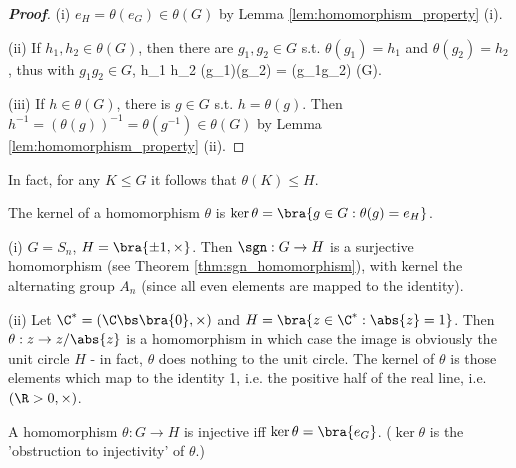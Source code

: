 \begin{proof}[\bf Proof]
\ben
\item [(i)] $e_H = \theta(e_G)\in \theta(G)$ by Lemma \ref{lem:homomorphism_property} (i).
\item [(ii)] If $h_1,h_2\in \theta(G)$, then there are $g_1,g_2\in G$ s.t. $\theta(g_1) = h_1$ and $\theta(g_2) = h_2$, thus with $g_1g_2\in G$,
\be
h_1 h_2 \in \theta(g_1)\theta(g_2) = \theta(g_1g_2) \in \theta(G).
\ee

\item [(iii)] If $h\in \theta(G)$, there is $g\in G$ s.t. $h = \theta(g)$. Then $h^{-1} = (\theta(g))^{-1} = \theta(g^{-1}) \in \theta(G)$ by Lemma \ref{lem:homomorphism_property} (ii).
\een
\end{proof}

\begin{remark}
In fact, for any $K\leq G$ it follows that $\theta(K) \leq H$.
\end{remark}


\begin{definition}[kernel]\label{def:kernel_group_homomorphism}
The kernel of a homomorphism $\theta$ is $\ker\theta = \bra{g\in G:\theta(g) =e_H}$.
\end{definition}

\begin{example}
\ben
\item [(i)] $G=S_n$, $H=\bra{\pm 1,\times}$. Then $\sgn: G\to H$ is a surjective homomorphism (see Theorem \ref{thm:sgn_homomorphism}), with kernel the alternating group $A_n$ (since all even elements are mapped to the identity).
\item [(ii)] Let $\C^* = (\C\bs\bra{0},\times)$ and $H=\bra{z\in \C^*:\abs{z}=1}$. Then $\theta:z\to z/\abs{z}$ is a homomorphism in which case the image is obviously the unit circle $H$ - in fact, $\theta$ does nothing to the unit circle. The kernel of $\theta$ is those elements which map to the identity 1, i.e. the positive half of the real line, i.e. $(\R>0,\times)$.
\een
\end{example}

\begin{lemma}\label{lem:injective_kernel_group}
A homomorphism $\theta:G\to H$ is injective iff $\ker\theta = \bra{e_G}$. ($\ker\theta$ is the 'obstruction to injectivity' of $\theta$.)
\end{lemma}


